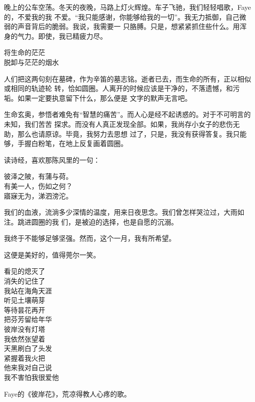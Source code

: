 		晚上的公车空荡。冬天的夜晚，马路上灯火辉煌。车子飞驰，我们轻轻唱歌，Faye的，不爱我的我
	不爱。“我只能感谢，你能够给我的一切”。我无力抵御，自己微弱的声音背后的脆弱。我说，我需要一
	只胳膊。只是，想紧紧抓住些什么。用浑身的气力。即使，我已精疲力尽。

		\longpoem{}{}{}
			将生命的茫茫 \\
			脱卸与茫茫的烟水
		\endlongpoem

		人们把这两句刻在墓碑，作为辛笛的墓志铭。逝者已去，而生命的所有，正以相似或相同的轨迹轮
	转，恰如圆圈。人离开的时候应该是干净的，不落遗憾，和污垢。如果一定要执意留下什么，那么便是
	文字的默声无言吧。


		生命玄奥，参悟者难免有“智慧的痛苦”。而人心是经不起诱惑的。对于不可明言的未知，我们苦苦
	探求。而没有人真正发现全部。如果，我尚存小女子的悲伤无助，那么也请原谅。毕竟，我努力去思想
	过了，只是，我没有获得答复。我只能够，手握白粉笔，在地上反复画着圆圈。


		读诗经，喜欢那陈风里的一句：

		\shortpoem{}{}{}
			彼泽之陂，有蒲与荷。\\
			有美一人，伤如之何？\\
			寤寐无为，涕泗滂沱。\\
		\endshortpoem

		我们的血液，流淌多少深情的温度，用来日夜思念。我们曾怎样哭泣过，大雨如注。跳进圆圈的我
	们，是被迫的选择，也是自愿的沉溺。


		我终于不能够足够坚强。然而，这个一月，我有所希望。

		这便是美好的，值得莞尔一笑。

	\endwriting



		\longpoem{}{}{}
			看见的熄灭了 \\
			消失的记住了 \\
			我站在海角天涯 \\
			听见土壤萌芽 \\
			等待昙花再开 \\
			把芬芳留给年华 \\
			彼岸没有灯塔 \\
			我依然张望着 \\
			天黑刷白了头发 \\
			紧握着我火把 \\
			他来我对自己说 \\
			我不害怕我很爱他
		\endlongpoem

		Faye的《彼岸花》，荒凉得教人心疼的歌。

